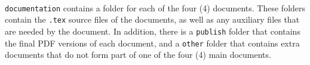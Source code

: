 \documentclass{article}
\begin{document}
    \paragraph{}
    \texttt{documentation} contains a folder for each of the four (4) documents.
    These folders contain the \texttt{.tex} source files of the documents, as
    well as any auxiliary files that are needed by the document. In addition,
    there is a \texttt{publish} folder that contains the final PDF versions of
    each document, and a \texttt{other} folder that contains extra documents
    that do not form part of one of the four (4) main documents.





\end{document}
